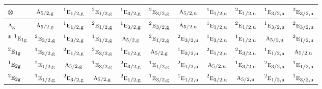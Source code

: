 \documentclass[10pt,a4paper]{article}
\numberwithin{equation}{section}
\newcommand{\irr}[1]{\text{\normalfont\scshape #1}}
\newcommand{\conjpair}[1]{{}^{#1}}
\newcommand{\ptag}[1]{\mathrm{#1}}
\newcommand{\irrprod}{\otimes}
\begin{document}
{\small\setlength{\tabcolsep}{3pt}\begin{longtable}{@{}lcccccccccc@{}}\toprule
$\irrprod$ & $\irr{a}_{5/2,\ptag{g}}$ & $\conjpair{1}\irr{e}_{1/2,\ptag{g}}$ & $\conjpair{2}\irr{e}_{1/2,\ptag{g}}$ & $\conjpair{1}\irr{e}_{3/2,\ptag{g}}$ & $\conjpair{2}\irr{e}_{3/2,\ptag{g}}$ & $\irr{a}_{5/2,\ptag{u}}$ & $\conjpair{1}\irr{e}_{1/2,\ptag{u}}$ & $\conjpair{2}\irr{e}_{1/2,\ptag{u}}$ & $\conjpair{1}\irr{e}_{3/2,\ptag{u}}$ & $\conjpair{2}\irr{e}_{3/2,\ptag{u}}$\\\midrule\endhead
\bottomrule\endfoot\endlastfoot
$\irr{a}_{\ptag{g}}$ & $\irr{a}_{5/2,\ptag{g}}$ & $\conjpair{1}\irr{e}_{1/2,\ptag{g}}$ & $\conjpair{2}\irr{e}_{1/2,\ptag{g}}$ & $\conjpair{1}\irr{e}_{3/2,\ptag{g}}$ & $\conjpair{2}\irr{e}_{3/2,\ptag{g}}$ & $\irr{a}_{5/2,\ptag{u}}$ & $\conjpair{1}\irr{e}_{1/2,\ptag{u}}$ & $\conjpair{2}\irr{e}_{1/2,\ptag{u}}$ & $\conjpair{1}\irr{e}_{3/2,\ptag{u}}$ & $\conjpair{2}\irr{e}_{3/2,\ptag{u}}$\\*
$\conjpair{1}\irr{e}_{1\ptag{g}}$ & $\conjpair{2}\irr{e}_{3/2,\ptag{g}}$ & $\conjpair{1}\irr{e}_{3/2,\ptag{g}}$ & $\conjpair{1}\irr{e}_{1/2,\ptag{g}}$ & $\irr{a}_{5/2,\ptag{g}}$ & $\conjpair{2}\irr{e}_{1/2,\ptag{g}}$ & $\conjpair{2}\irr{e}_{3/2,\ptag{u}}$ & $\conjpair{1}\irr{e}_{3/2,\ptag{u}}$ & $\conjpair{1}\irr{e}_{1/2,\ptag{u}}$ & $\irr{a}_{5/2,\ptag{u}}$ & $\conjpair{2}\irr{e}_{1/2,\ptag{u}}$\\
$\conjpair{2}\irr{e}_{1\ptag{g}}$ & $\conjpair{1}\irr{e}_{3/2,\ptag{g}}$ & $\conjpair{2}\irr{e}_{1/2,\ptag{g}}$ & $\conjpair{2}\irr{e}_{3/2,\ptag{g}}$ & $\conjpair{1}\irr{e}_{1/2,\ptag{g}}$ & $\irr{a}_{5/2,\ptag{g}}$ & $\conjpair{1}\irr{e}_{3/2,\ptag{u}}$ & $\conjpair{2}\irr{e}_{1/2,\ptag{u}}$ & $\conjpair{2}\irr{e}_{3/2,\ptag{u}}$ & $\conjpair{1}\irr{e}_{1/2,\ptag{u}}$ & $\irr{a}_{5/2,\ptag{u}}$\\
$\conjpair{1}\irr{e}_{2\ptag{g}}$ & $\conjpair{2}\irr{e}_{1/2,\ptag{g}}$ & $\irr{a}_{5/2,\ptag{g}}$ & $\conjpair{1}\irr{e}_{3/2,\ptag{g}}$ & $\conjpair{2}\irr{e}_{3/2,\ptag{g}}$ & $\conjpair{1}\irr{e}_{1/2,\ptag{g}}$ & $\conjpair{2}\irr{e}_{1/2,\ptag{u}}$ & $\irr{a}_{5/2,\ptag{u}}$ & $\conjpair{1}\irr{e}_{3/2,\ptag{u}}$ & $\conjpair{2}\irr{e}_{3/2,\ptag{u}}$ & $\conjpair{1}\irr{e}_{1/2,\ptag{u}}$\\
$\conjpair{2}\irr{e}_{2\ptag{g}}$ & $\conjpair{1}\irr{e}_{1/2,\ptag{g}}$ & $\conjpair{2}\irr{e}_{3/2,\ptag{g}}$ & $\irr{a}_{5/2,\ptag{g}}$ & $\conjpair{2}\irr{e}_{1/2,\ptag{g}}$ & $\conjpair{1}\irr{e}_{3/2,\ptag{g}}$ & $\conjpair{1}\irr{e}_{1/2,\ptag{u}}$ & $\conjpair{2}\irr{e}_{3/2,\ptag{u}}$ & $\irr{a}_{5/2,\ptag{u}}$ & $\conjpair{2}\irr{e}_{1/2,\ptag{u}}$ & $\conjpair{1}\irr{e}_{3/2,\ptag{u}}$\\

\end{longtable}}
\end{document}
